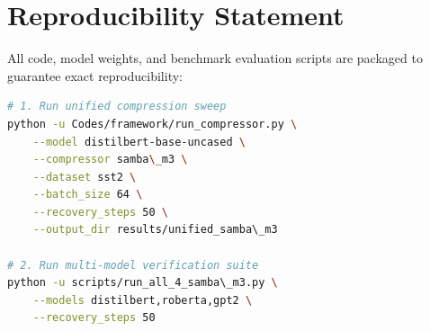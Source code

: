 \section{Reproducibility Statement}
All code, model weights, and benchmark evaluation scripts are packaged to guarantee exact reproducibility:
\begin{lstlisting}[language=bash]
# 1. Run unified compression sweep
python -u Codes/framework/run_compressor.py \
    --model distilbert-base-uncased \
    --compressor samba\_m3 \
    --dataset sst2 \
    --batch_size 64 \
    --recovery_steps 50 \
    --output_dir results/unified_samba\_m3

# 2. Run multi-model verification suite
python -u scripts/run_all_4_samba\_m3.py \
    --models distilbert,roberta,gpt2 \
    --recovery_steps 50
\end{lstlisting}
